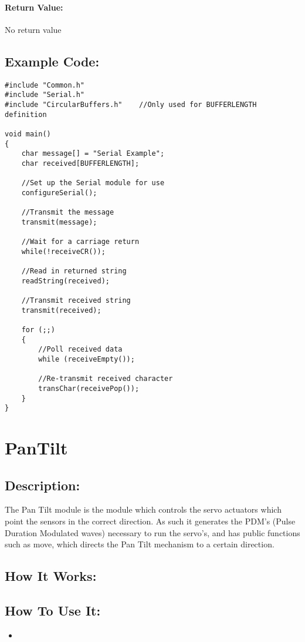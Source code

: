 \documentclass[]{report}
\begin{document}
\subsubsection{Return Value:}
No return value


\section{Example Code:}
\begin{lstlisting}
#include "Common.h"
#include "Serial.h"
#include "CircularBuffers.h"	//Only used for BUFFERLENGTH definition

void main()
{
	char message[] = "Serial Example";
	char received[BUFFERLENGTH];

	//Set up the Serial module for use
	configureSerial();
	
	//Transmit the message
	transmit(message);
	
	//Wait for a carriage return
	while(!receiveCR());
		
	//Read in returned string
	readString(received);
		
	//Transmit received string
	transmit(received);
	
	for (;;)
	{
		//Poll received data
		while (receiveEmpty());
		
		//Re-transmit received character
		transChar(receivePop());
	}
}
\end{lstlisting}

\chapter{PanTilt}
\section{Description:}
The Pan Tilt module is the module which controls the servo actuators which point the sensors in the correct direction. As such it generates the PDM's (Pulse Duration Modulated waves) necessary to run the servo's, and has public functions such as move, which directs the Pan Tilt mechanism to a certain direction.

\section{How It Works:}

\section{How To Use It:}
\begin{itemize}
	\item 
\end{itemize}
\end{document}
